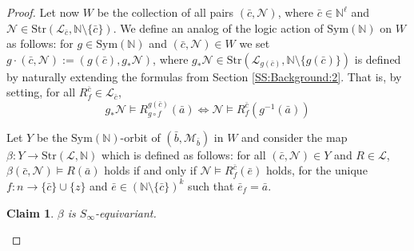 \documentclass[11pt]{amsart}
\theoremstyle{plain}
\newtheorem{claim}[theorem]{Claim}
\theoremstyle{definition}
\newcommand{\N}{\mathbb{N}}
\begin{document}
\begin{proof}
Let now $W$ be the collection of all pairs $(\bar{c},\mathcal{N})$,  where $\bar{c}\in \N^{\ell}$ and $\mathcal{N}\in \mathrm{Str}(\mathcal{L}_{\bar{c}},\N \setminus \{\bar{c}\})$.
 We define an analog of the logic action of $\mathrm{Sym}(\N)$ on $W$ as follows: for $g\in \mathrm{Sym}(\N)$ and $(\bar{c},\mathcal{N})\in W$  we set $g\cdot(\bar{c},\mathcal{N}):=(g(\bar{c}),g_*\mathcal{N})$, where  $g_*\mathcal{N}\in \mathrm{Str}(\mathcal{L}_{g(\bar{c})},\N\setminus\{ g(\bar{c})\})$ is defined by naturally extending the formulas from Section \ref{SS:Background:2}. That is, by 
 setting, for all $R^{\bar{c}}_f\in \mathcal{L}_{\bar{c}}$,
 \[g_*\mathcal{N}\models R^{g(\bar{c})}_{g\circ f}(\bar{a})\iff \mathcal{N}\models R^{\bar{c}}_f(g^{-1}(\bar{a}))\] 



Let   $Y$  be the $\mathrm{Sym}(\N)$-orbit of $(\bar{b},\mathcal{M}_{\bar{b}})$ in $W$ and consider the map $\beta \colon Y \to  \mathrm{Str}(\mathcal{L},\N)$ which is defined as follows:  for all $(\bar{c},\mathcal{N})\in Y$ and $R\in\mathcal{L}$, ${\beta(\bar{c},\mathcal{N})}\models R(\bar{a})$ holds if and only if ${\mathcal{N}}\models R^{\bar{c}}_{f}(\bar{e})$ holds, for the unique   $f\colon n \to \{\bar{c}\}\cup \{z\}$ and  $\bar{e}\in (\N \setminus \{\bar{c}\})^k$ such that $\bar{e}_f=\bar{a}$.

\begin{claim}
    $\beta$ is  $S_\infty$-equivariant.
\end{claim}


\end{proof}
\end{document}
